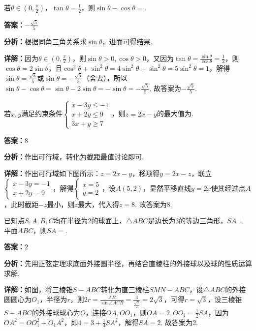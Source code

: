 \begin{question}[points=5]
若$\theta\in(0,\frac{\pi}{2})$，$\tan\theta=\frac{1}{2}$，则$\sin\theta-\cos\theta=$.
\begin{solution}
\textbf{答案：}$-\frac{\sqrt{5}}{5}$

\textbf{分析：}根据同角三角关系求$\sin\theta$，进而可得结果.

\textbf{详解：}因为$\theta\in(0,\frac{\pi}{2})$，则$\sin\theta>0, \cos\theta>0$，又因为$\tan\theta=\frac{\sin\theta}{\cos\theta}=\frac{1}{2}$，则$\cos\theta=2\sin\theta$，且$\cos^2\theta+\sin^2\theta=4\sin^2\theta+\sin^2\theta=5\sin^2\theta=1$，解得$\sin\theta=\frac{\sqrt{5}}{5}$或$\sin\theta=-\frac{\sqrt{5}}{5}$（舍去），所以$\sin\theta-\cos\theta=\sin\theta-2\sin\theta=-\sin\theta=-\frac{\sqrt{5}}{5}$. 故答案为$-\frac{\sqrt{5}}{5}$.
\end{solution}
\end{question}

\begin{question}[points=5]
若$x,y$满足约束条件$\begin{cases}x-3y\le-1\\x+2y\le9\\3x+y\ge7\end{cases}$，则$z=2x-y$的最大值为.
\fillin[{$8$}]
\begin{solution}
\textbf{答案：}$8$

\textbf{分析：}作出可行域，转化为截距最值讨论即可.

\textbf{详解：}作出可行域如下图所示：$z=2x-y$，移项得$y=2x-z$，联立$\begin{cases}x-3y=-1\\x+2y=9\end{cases}$，解得$\begin{cases}x=5\\y=2\end{cases}$，设$A(5,2)$，显然平移直线$y=2x$使其经过点$A$，此时截距$-z$最小，则$z$最大，代入得$z=8$. 故答案为8.
\end{solution}
\end{question}

\begin{question}[points=5]
已知点$S,A,B,C$均在半径为2的球面上，$\triangle ABC$是边长为3的等边三角形，$SA\perp$平面$ABC$，则$SA=$.
\fillin[{$2$}]
\begin{solution}
\textbf{答案：}$2$

\textbf{分析：}先用正弦定理求底面外接圆半径，再结合直棱柱的外接球以及球的性质运算求解.

\textbf{详解：}如图，将三棱锥$S-ABC$转化为直三棱柱$SMN-ABC$，设$\triangle ABC$的外接圆圆心为$O_1$，半径为$r$，则$2r=\frac{AB}{\sin\angle ACB}=\frac{3}{\frac{\sqrt{3}}{2}}=2\sqrt{3}$，可得$r=\sqrt{3}$，设三棱锥$S-ABC$的外接球球心为$O$，连接$OA, OO_1$，则$OA=2, OO_1=\frac{1}{2}SA$，因为$OA^2=OO_1^2+O_1A^2$，即$4=3+\frac{1}{4}SA^2$，解得$SA=2$. 故答案为2.
\end{solution}
\end{question}

